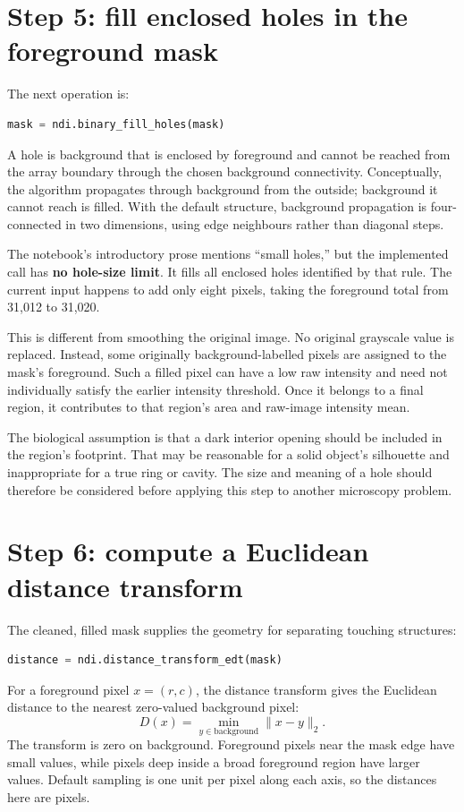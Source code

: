 \documentclass[11pt,letterpaper]{article}
\begin{document}
\section{Step 5: fill enclosed holes in the foreground mask}
\label{sec:holes}

The next operation is:
\begin{lstlisting}[language=Python]
mask = ndi.binary_fill_holes(mask)
\end{lstlisting}
A hole is background that is enclosed by foreground and cannot be reached from the array boundary through the chosen background connectivity. Conceptually, the algorithm propagates through background from the outside; background it cannot reach is filled. With the default structure, background propagation is four-connected in two dimensions, using edge neighbours rather than diagonal steps.\cite{holes}

The notebook's introductory prose mentions ``small holes,'' but the implemented call has \textbf{no hole-size limit}. It fills all enclosed holes identified by that rule. The current input happens to add only eight pixels, taking the foreground total from 31,012 to 31,020.

This is different from smoothing the original image. No original grayscale value is replaced. Instead, some originally background-labelled pixels are assigned to the mask's foreground. Such a filled pixel can have a low raw intensity and need not individually satisfy the earlier intensity threshold. Once it belongs to a final region, it contributes to that region's area and raw-image intensity mean.

The biological assumption is that a dark interior opening should be included in the region's footprint. That may be reasonable for a solid object's silhouette and inappropriate for a true ring or cavity. The size and meaning of a hole should therefore be considered before applying this step to another microscopy problem.

\section{Step 6: compute a Euclidean distance transform}
\label{sec:distance}

The cleaned, filled mask supplies the geometry for separating touching structures:
\begin{lstlisting}[language=Python]
distance = ndi.distance_transform_edt(mask)
\end{lstlisting}
For a foreground pixel $x=(r,c)$, the distance transform gives the Euclidean distance to the nearest zero-valued background pixel:
\begin{equation}
D(x)=\min_{y\in\mathrm{background}}\|x-y\|_{2}.
\end{equation}
The transform is zero on background. Foreground pixels near the mask edge have small values, while pixels deep inside a broad foreground region have larger values. Default sampling is one unit per pixel along each axis, so the distances here are pixels.\cite{edt}
\end{document}
